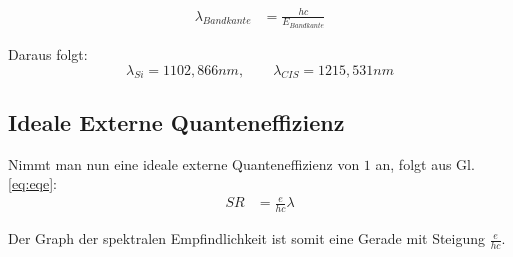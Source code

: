 \begin{align}
\lambda_{Bandkante} &= \frac{hc}{E_{Bandkante}}
\end{align}

Daraus folgt: \\

\begin{equation}
\lambda_{Si} = 1102,866 nm, \qquad \lambda_{CIS} = 1215,531 nm
\end{equation}


\subsection{Ideale Externe Quanteneffizienz}

Nimmt man nun eine ideale externe Quanteneffizienz von $1$ an, folgt aus Gl. \ref{eq:eqe}:
\begin{align}
SR &= \frac{e}{hc}\lambda
\end{align}

Der Graph der spektralen Empfindlichkeit ist somit eine Gerade mit Steigung $\frac{e}{hc}$.